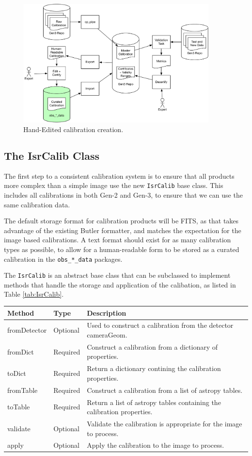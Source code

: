 \documentclass[DM,authoryear,toc]{lsstdoc}
\begin{document}
\begin{figure}
  \caption{Hand-Edited calibration creation. \label{fig:EditedWF}}
  \centering
  \includegraphics[width=0.9\textwidth]{figures/Hand-Edited_Calibration.pdf}
\end{figure}


\subsection{The IsrCalib Class}
The first step to a consistent calibration system is to ensure that
all products more complex than a simple image use the new
\verb|IsrCalib| base class.  This includes all calibrations in both
Gen-2 and Gen-3, to ensure that we can use the same calibration data.

The default storage format for calibration products will be FITS, as
that takes advantage of the existing Butler formatter, and matches the
expectation for the image based calibrations.  A text format should
exist for as many calibration types as possible, to allow for a
human-readable form to be stored as a curated calibration in the
\verb|obs_*_data| packages.

The \verb|IsrCalib| is an abstract base class that can be subclassed to implement methods that handle the storage and application of the calibation, as listed in Table \ref{tab:IsrCalib}.
\begin{tabular}{l l l}
  \label{tab:IsrCalib}
  Method & Type & Description \\
  \hline
  fromDetector & Optional & Used to construct a calibration from the detector cameraGeom. \\
  fromDict & Required & Construct a calibration from a dictionary of properties. \\
  toDict & Required & Return a dictionary contining the calibration properties. \\
  fromTable & Required & Construct a calibration from a list of astropy tables. \\
  toTable & Required & Return a list of astropy tables containing the calibration properties. \\
  validate & Optional & Validate the calibration is appropriate for the image to process. \\
  apply & Optional & Apply the calibration to the image to process. \\
\end{tabular}
\end{document}
